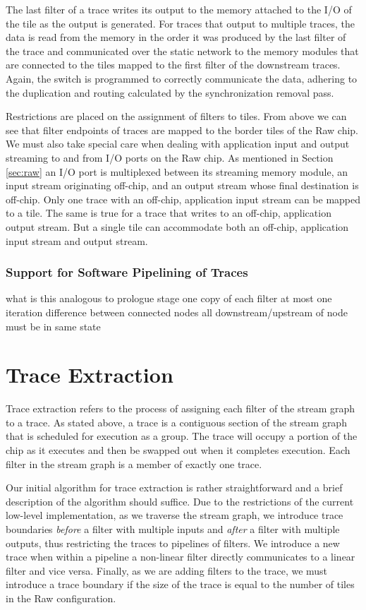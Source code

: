 The last filter of a trace writes its output to the memory attached to
the I/O of the tile as the output is generated. For traces that output
to multiple traces, the data is read from the memory in the order it
was produced by the last filter of the trace and communicated over the
static network to the memory modules that are connected to the tiles
mapped to the first filter of the downstream traces. Again, the switch
is programmed to correctly communicate the data, adhering to the
duplication and routing calculated by the synchronization removal
pass.

Restrictions are placed on the assignment of filters to tiles. From
above we can see that filter endpoints of traces are mapped to the
border tiles of the Raw chip. We must also take special care when
dealing with application input and output streaming to and from I/O
ports on the Raw chip.  As mentioned in Section \ref{sec:raw} an I/O
port is multiplexed between its streaming memory module, an input
stream originating off-chip, and an output stream whose final
destination is off-chip.  Only one trace with an off-chip, application
input stream can be mapped to a tile.  The same is true for a trace
that writes to an off-chip, application output stream.  But a single
tile can accommodate both an off-chip, application input stream and
output stream.

\subsubsection{Support for Software Pipelining of Traces}
\label{sec:softpipe}
 what is this analogous to 
prologue stage
one copy of each filter
at most one iteration difference between connected nodes
all downstream/upstream of node must be in same state

\section{Trace Extraction}
Trace extraction refers to the process of assigning each filter of the
stream graph to a trace.  As stated above, a trace is a contiguous
section of the stream graph that is scheduled for execution as a
group. The trace will occupy a portion of the chip as it executes and
then be swapped out when it completes execution.  Each filter in the
stream graph is a member of exactly one trace.

Our initial algorithm for trace extraction is rather straightforward
and a brief description of the algorithm should suffice.  Due to the
restrictions of the current low-level implementation, as we traverse
the stream graph, we introduce trace boundaries {\it before} a filter
with multiple inputs and {\it after} a filter with multiple outputs,
thus restricting the traces to pipelines of filters. We introduce a
new trace when within a pipeline a non-linear filter directly
communicates to a linear filter and vice versa. Finally, as we are
adding filters to the trace, we must introduce a trace boundary if the
size of the trace is equal to the number of tiles in the Raw
configuration.

